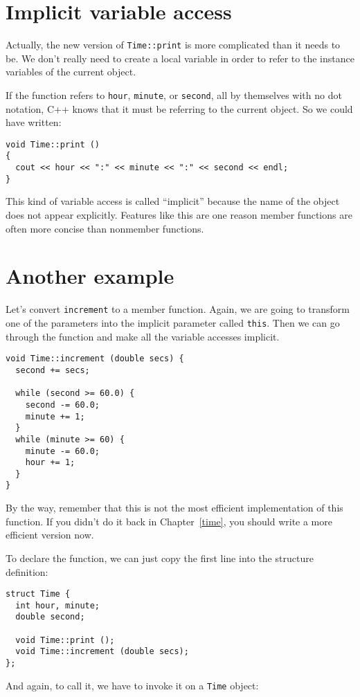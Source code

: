 \section {Implicit variable access}

Actually, the new version of {\tt Time::print} is more complicated
than it needs to be.  We don't really need to create a local
variable in order to refer to the instance variables of the current
object.

If the function refers to {\tt hour}, {\tt minute}, or {\tt second},
all by themselves with no dot notation, C++ knows that it must
be referring to the current object.  So we could have written:

\begin{verbatim}
void Time::print ()
{
  cout << hour << ":" << minute << ":" << second << endl;
}
\end{verbatim}
%
This kind of variable access is called ``implicit'' because the
name of the object does not appear explicitly.  Features like
this are one reason member functions are often more concise
than nonmember functions.

\section {Another example}

Let's convert {\tt increment} to a member function.  Again, we
are going to transform one of the parameters into the implicit
parameter called {\tt this}.  Then we can go through the function
and make all the variable accesses implicit.

\begin{verbatim}
void Time::increment (double secs) {
  second += secs;

  while (second >= 60.0) {
    second -= 60.0;
    minute += 1;
  }
  while (minute >= 60) {
    minute -= 60.0;
    hour += 1;
  }
}
\end{verbatim}
%
By the way, remember that this is not the most efficient implementation
of this function.  If you didn't do it back in Chapter~\ref{time}, you
should write a more efficient version now.

To declare the function, we can just copy the first line into the
structure definition:

\begin{verbatim}
struct Time {
  int hour, minute;
  double second;

  void Time::print ();
  void Time::increment (double secs);
};
\end{verbatim}
%
And again, to call it, we have to invoke it on a {\tt Time}
object:

